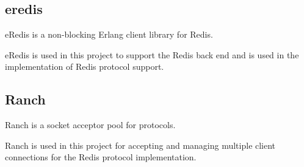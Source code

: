 \subsection{eredis}

eRedis \citep{eredis} is a non-blocking Erlang client library for Redis.

eRedis is used in this project to support the Redis back end and is used in the
implementation of Redis protocol support.

\subsection{Ranch}

Ranch \citep{ranch} is a socket acceptor pool for  protocols.

Ranch is used in this project for accepting and managing multiple client
connections for the Redis protocol implementation.

